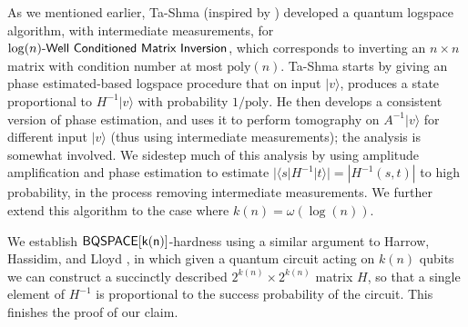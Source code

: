 \documentclass[11pt]{article}
\newcommand{\classfont}{\sf}
\newtheorem{theorem}[lemma]{Theorem}
\newtheorem{corollary}[lemma]{Corollary}
\newtheorem{definition}[lemma]{Definition}
\numberwithin{lemma}{section}
\theoremstyle{definition}
\newcommand\BQSPACE{\sf{BQSPACE}}
\newcommand\Logspace{{\sf{L}}}
\newcommand\bigoh{\mathcal{O}}
\newcommand{\Unitary}{\mathbf{U}}
\newcommand{\unitaryBQL}{{\classfont{BQL}}}
\newcommand{\poly}{\mathrm{poly}}
\renewcommand{\leq}{\leqslant}
\renewcommand{\geq}{\geqslant}
\renewcommand{\le}{\leqslant}
\newcommand{\ket}[1]{|#1\rangle}
\newcommand{\bra}[1]{\langle#1|}
\newcommand\matrixinversion[1]{#1\textit{\sf{-Well Conditioned Matrix Inversion}}}
\begin{document}
As we mentioned earlier, Ta-Shma \cite{tashma} (inspired by \cite{HHL}) developed a quantum logspace algorithm, with intermediate measurements, for $\matrixinversion{\log(n)}$, which corresponds to inverting an $n \times n$ matrix with condition number at most $\poly(n)$. Ta-Shma starts by giving an phase estimated-based logspace procedure that on input $\ket{v}$, produces a state proportional to $H^{-1}\ket{v}$ with probability $1/\poly$. He then develops a consistent version of phase estimation, and uses it to perform tomography on $A^{-1}\ket{v}$ for different input $\ket{v}$ (thus using intermediate measurements); the analysis is somewhat involved. We sidestep much of this analysis by using amplitude amplification and phase estimation to estimate $|\bra{s} H^{-1} \ket{t}| = |H^{-1}(s,t)|$ to high probability, in the process removing intermediate measurements. We further extend this algorithm to the case where $k(n) = \omega(\log(n))$.

We establish $\BQSPACE[k(n)]$-hardness using a similar argument to Harrow, Hassidim, and Lloyd \cite{HHL}, in which given a quantum circuit acting on $k(n)$ qubits we can construct a succinctly described $2^{k(n)}\times 2^{k(n)}$ matrix $H$, so that a single element of $H^{-1}$ is proportional to the success probability of the circuit.  This finishes the proof of our claim.  
%
%
 

\end{document}
